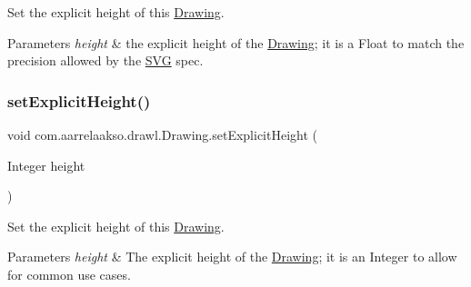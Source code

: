 Set the explicit height of this \hyperlink{classcom_1_1aarrelaakso_1_1drawl_1_1_drawing}{Drawing}. 


\begin{DoxyParams}{Parameters}
{\em height} & the explicit height of the \hyperlink{classcom_1_1aarrelaakso_1_1drawl_1_1_drawing}{Drawing}; it is a Float to match the precision allowed by the \hyperlink{classcom_1_1aarrelaakso_1_1drawl_1_1_s_v_g}{S\+VG} spec. \\
\hline
\end{DoxyParams}
\mbox{\label{classcom_1_1aarrelaakso_1_1drawl_1_1_drawing_a418641b3099d2070ee0fa69dc7b35af1}} 
\subsubsection{\texorpdfstring{set\+Explicit\+Height()}{setExplicitHeight()}\hspace{0.1cm}{\footnotesize\ttfamily [3/3]}}
{\footnotesize\ttfamily void com.\+aarrelaakso.\+drawl.\+Drawing.\+set\+Explicit\+Height (\begin{DoxyParamCaption}\item[{Integer}]{height }\end{DoxyParamCaption})}



Set the explicit height of this \hyperlink{classcom_1_1aarrelaakso_1_1drawl_1_1_drawing}{Drawing}. 


\begin{DoxyParams}{Parameters}
{\em height} & The explicit height of the \hyperlink{classcom_1_1aarrelaakso_1_1drawl_1_1_drawing}{Drawing}; it is an Integer to allow for common use cases. \\
\hline
\end{DoxyParams}
\mbox{\label{classcom_1_1aarrelaakso_1_1drawl_1_1_drawing_a7f46180af4ae33964aba962625adff58}} 

